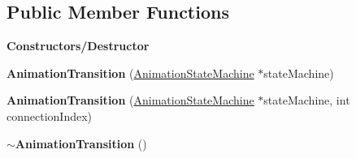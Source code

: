 \subsection*{Public Member Functions}
\begin{Indent}\textbf{ Constructors/\+Destructor}\par
\begin{DoxyCompactItemize}
\item 
\mbox{\label{classrev_1_1_animation_transition_a1b8c2cf098d1e709bd7b4d349243b226}} 
{\bfseries Animation\+Transition} (\mbox{\hyperlink{classrev_1_1_animation_state_machine}{Animation\+State\+Machine}} $\ast$state\+Machine)
\item 
\mbox{\label{classrev_1_1_animation_transition_af7550a4be10839f785b266a83bf9620c}} 
{\bfseries Animation\+Transition} (\mbox{\hyperlink{classrev_1_1_animation_state_machine}{Animation\+State\+Machine}} $\ast$state\+Machine, int connection\+Index)
\item 
\mbox{\label{classrev_1_1_animation_transition_a519d70cba3ae42e539a47d799d1a4eaa}} 
{\bfseries $\sim$\+Animation\+Transition} ()
\end{DoxyCompactItemize}
\end{Indent}

